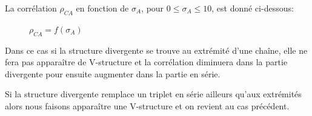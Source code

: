 \documentclass[a4paper]{article}
\begin{document}
\begin{enumerate}
La corrélation $\rho_{CA}$ en fonction de $\sigma_{A}$, pour $0\le \sigma_{A} \le 10$,   est donné  ci-dessous:

\begin{figure}[H]
\centering
{}
\caption{   $\rho_{CA}=f(\sigma_{A})$ }\label{fig:somefiglabel}
\end{figure}

Dans ce cas si la structure divergente se trouve au extrémité d'une chaîne, elle ne fera pas apparaître de V-structure et la corrélation diminuera dans la partie divergente pour ensuite augmenter dans la partie en série.

Si la structure divergente remplace un triplet en série  ailleurs qu'aux extrémités alors nous faisons apparaître une V-structure et on revient au cas précédent. 
\end{enumerate}
\end{document}
